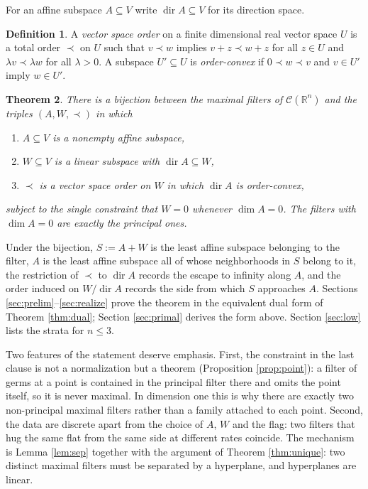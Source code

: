 \documentclass[11pt]{amsart}
\theoremstyle{plain}
\newtheorem{theorem}{Theorem}[section]
\theoremstyle{definition}
\newtheorem{definition}[theorem]{Definition}
\DeclareMathOperator{\dir}{dir}
\newcommand{\CC}{\mathscr{C}}
\newcommand{\RR}{\mathbb{R}}
\begin{document}
For an affine subspace $A\subseteq V$ write $\dir A\subseteq V$ for its direction space.

\begin{definition}\label{def:vso}
A \emph{vector space order} on a finite dimensional real vector space $U$ is a total order $\prec$ on $U$ such that $v\prec w$ implies $v+z\prec w+z$ for all $z\in U$ and $\lambda v\prec\lambda w$ for all $\lambda>0$. A subspace $U'\subseteq U$ is \emph{order-convex} if $0\prec w\prec v$ and $v\in U'$ imply $w\in U'$.
\end{definition}

\begin{theorem}\label{thm:main}
There is a bijection between the maximal filters of $\CC(\RR^n)$ and the triples $(A,W,\prec)$ in which
\begin{enumerate}
\item $A\subseteq V$ is a nonempty affine subspace,
\item $W\subseteq V$ is a linear subspace with $\dir A\subseteq W$,
\item $\prec$ is a vector space order on $W$ in which $\dir A$ is order-convex,
\end{enumerate}
subject to the single constraint that $W=0$ whenever $\dim A=0$. The filters with $\dim A=0$ are exactly the principal ones.
\end{theorem}

Under the bijection, $S:=A+W$ is the least affine subspace belonging to the filter, $A$ is the least affine subspace all of whose neighborhoods in $S$ belong to it, the restriction of $\prec$ to $\dir A$ records the escape to infinity along $A$, and the order induced on $W/\dir A$ records the side from which $S$ approaches $A$. Sections \ref{sec:prelim}--\ref{sec:realize} prove the theorem in the equivalent dual form of Theorem \ref{thm:dual}; Section \ref{sec:primal} derives the form above. Section \ref{sec:low} lists the strata for $n\le 3$.

Two features of the statement deserve emphasis. First, the constraint in the last clause is not a normalization but a theorem (Proposition \ref{prop:point}): a filter of germs at a point is contained in the principal filter there and omits the point itself, so it is never maximal. In dimension one this is why there are exactly two non-principal maximal filters rather than a family attached to each point. Second, the data are discrete apart from the choice of $A$, $W$ and the flag: two filters that hug the same flat from the same side at different rates coincide. The mechanism is Lemma \ref{lem:sep} together with the argument of Theorem \ref{thm:unique}: two distinct maximal filters must be separated by a hyperplane, and hyperplanes are linear.
\end{document}
